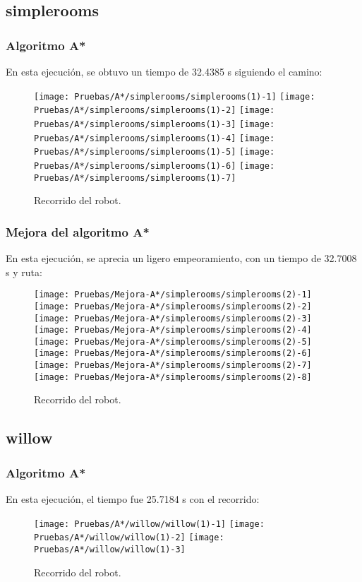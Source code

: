 \documentclass[a4paper, 11pt]{article}
\begin{document}
	\subsection{simplerooms}
		\subsubsection{Algoritmo A*}
			En esta ejecución, se obtuvo un tiempo de 32.4385 s siguiendo el camino:
			\begin{figure}[H]
				\centering
				\texttt{[image: Pruebas/A*/simplerooms/simplerooms(1)-1]}
				\texttt{[image: Pruebas/A*/simplerooms/simplerooms(1)-2]}
				\texttt{[image: Pruebas/A*/simplerooms/simplerooms(1)-3]}
				\texttt{[image: Pruebas/A*/simplerooms/simplerooms(1)-4]}
				\texttt{[image: Pruebas/A*/simplerooms/simplerooms(1)-5]}
				\texttt{[image: Pruebas/A*/simplerooms/simplerooms(1)-6]}
				\texttt{[image: Pruebas/A*/simplerooms/simplerooms(1)-7]}
				\caption{Recorrido del robot.}
				\label{A-sim}
			\end{figure}
			
		\subsubsection{Mejora del algoritmo A*}
			En esta ejecución, se aprecia un ligero empeoramiento, con un tiempo de 32.7008 s y ruta: 

			\begin{figure}[H]
				\centering
				\texttt{[image: Pruebas/Mejora-A*/simplerooms/simplerooms(2)-1]}
				\texttt{[image: Pruebas/Mejora-A*/simplerooms/simplerooms(2)-2]}
				\texttt{[image: Pruebas/Mejora-A*/simplerooms/simplerooms(2)-3]}
				\texttt{[image: Pruebas/Mejora-A*/simplerooms/simplerooms(2)-4]}
				\texttt{[image: Pruebas/Mejora-A*/simplerooms/simplerooms(2)-5]}
				\texttt{[image: Pruebas/Mejora-A*/simplerooms/simplerooms(2)-6]}
				\texttt{[image: Pruebas/Mejora-A*/simplerooms/simplerooms(2)-7]}
				\texttt{[image: Pruebas/Mejora-A*/simplerooms/simplerooms(2)-8]}
				\caption{Recorrido del robot.}
				\label{MA-sim}
			\end{figure}
			
	\subsection{willow}
		\subsubsection{Algoritmo A*}
			En esta ejecución, el tiempo fue 25.7184 s con el recorrido:
			\begin{figure}[H]
				\centering
				\texttt{[image: Pruebas/A*/willow/willow(1)-1]}
				\texttt{[image: Pruebas/A*/willow/willow(1)-2]}
				\texttt{[image: Pruebas/A*/willow/willow(1)-3]}
				\caption{Recorrido del robot.}
				\label{A-wil}
			\end{figure}
			
\end{document}
